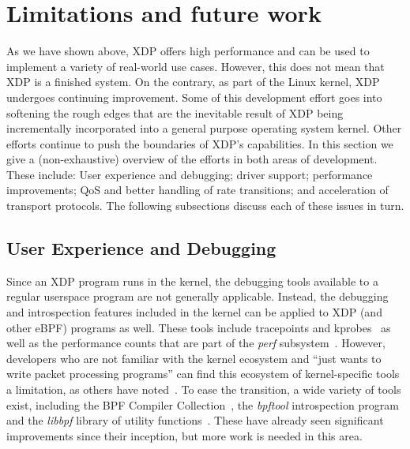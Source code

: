 \documentclass[10pt,sigconf]{acmart}
\begin{document}
\section{Limitations and future work}
\label{sec:limitations}
As we have shown above, XDP offers high performance and can be used to implement
a variety of real-world use cases. However, this does not mean that XDP is a
finished system. On the contrary, as part of the Linux kernel, XDP undergoes
continuing improvement. Some of this development effort goes into softening the
rough edges that are the inevitable result of XDP being incrementally
incorporated into a general purpose operating system kernel. Other efforts
continue to push the boundaries of XDP's capabilities. In this section we give a
(non-exhaustive) overview of the efforts in both areas of development. These
include: User experience and debugging; driver support; performance
improvements; QoS and better handling of rate transitions; and acceleration of
transport protocols. The following subsections discuss each of these issues in
turn.

\subsection{User Experience and Debugging}
\label{sec:user-exper-debugg}
Since an XDP program runs in the kernel, the debugging tools available to a
regular userspace program are not generally applicable. Instead, the debugging
and introspection features included in the kernel can be applied to XDP (and
other eBPF) programs as well. These tools include tracepoints and
kprobes~\cite{kernel-tracing} as well as the performance counts that are part of
the \emph{perf} subsystem~\cite{perf}. However, developers who are not familiar
with the kernel ecosystem and ``just wants to write packet processing programs''
can find this ecosystem of kernel-specific tools a limitation, as others have
noted~\cite{miano2018creating}. To ease the transition, a wide variety of tools
exist, including the BPF Compiler Collection~\cite{bcc}, the \emph{bpftool}
introspection program~\cite{bpftool} and the \emph{libbpf} library of utility
functions~\cite{libbpf}. These have already seen significant improvements since
their inception, but more work is needed in this area.
\end{document}
